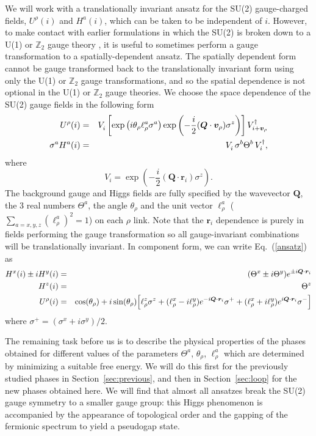 \documentclass[aps,prb,preprint,onecolumn,citeautoscript,superscriptaddress,footinbib,
eqsecnum]{revtex4-1}
\newcommand{\beq}{\begin{equation}}
\newcommand{\eeq}{\end{equation}}
\def\bea{\begin{eqnarray}}
\def\eea{\end{eqnarray}}
\newcommand{\nn}{\nonumber \\}
\begin{document}
We will work with a translationally invariant ansatz \cite{Wen2002} 
for the SU(2) gauge-charged fields, $U^\rho (i)$ and $H^a (i)$, which can be taken to be independent of $i$. However, to make contact with 
earlier formulations in which the SU(2) is broken down to a U(1) or $\mathbb{Z}_2$ gauge theory \cite{SS09,DCSS15b,DCSS16}, 
it is useful to sometimes perform a gauge transformation to a spatially-dependent ansatz. 
The spatially dependent form cannot be gauge transformed back to the translationally invariant form using only the U(1) or $\mathbb{Z}_2$ gauge transformations, and so the spatial dependence is not optional
in the U(1) or $\mathbb{Z}_2$ gauge theories. 
We choose the space dependence of the SU(2) gauge fields
in the following form
\bea
U^\rho (i) &=&  V_{i}^{\vphantom \dagger} \left[ \exp \left( i \theta_\rho \ell_\rho^{ a} \sigma^a \right) \exp \left(  -\frac{i}{2} ({\bm Q} \cdot {\bm v}_{\rho}) \sigma^z \right) \right]
V_{i + {\bm v}_\rho}^\dagger  \nn
\sigma^a H^a (i) &=& V_{i}^{\vphantom \dagger} \, \sigma^b \Theta^b \,  V_{i}^{\dagger},
 \label{ansatz}
\eea
where
\beq
V_i =  \exp \left( - \frac{i}{2} ({\bm Q} \cdot {\bm r}_i) \sigma^z \right).
\eeq
The background gauge and Higgs fields are fully 
specified by the wavevector ${\bm Q}$, the 3 real numbers $\Theta^a$, the angle $\theta_\rho$ and the unit vector $\ell^a_\rho$
($\sum_{a = x,y,z} (\ell^{a}_\rho)^2 = 1$) on each $\rho$ link. Note that the ${\bm r}_i$ dependence is purely in fields performing the gauge transformation
so all gauge-invariant combinations will be translationally invariant. 
In component form, we can write Eq.~(\ref{ansatz}) as
\bea
H^x (i) \pm i H^y (i) &=& (\Theta^x \pm i \Theta^y) e^{\pm i {\bm Q} \cdot {\bm r}_i} \nn\
H^z (i) &=& \Theta^z \nn
U^\rho (i) &=& \cos(\theta_\rho) + i \sin (\theta_\rho) \Bigl[ 
\ell_\rho^z \sigma^z + (\ell_\rho^x - i \ell_\rho^y) e^{-i {\bm Q} \cdot {\bm r}_i} \sigma^+ + (\ell_\rho^x + i \ell_\rho^y) e^{i {\bm Q} \cdot {\bm r}_i} \sigma^- \Bigr] \label{ansatz2}
\eea
where $\sigma^+ = (\sigma^x + i \sigma^y)/2$.

The remaining task before us is to describe the physical properties of the phases obtained for different values of the parameters
$\Theta^a$, $\theta_\rho$, $\ell^a_\rho$ which are determined by
minimizing a suitable free energy. We will do this first for the previously studied phases  in Section~\ref{sec:previous}, and then in Section~\ref{sec:loop} for the new phases obtained here. We will find that almost all ansatzes break the SU(2)
gauge symmetry to a smaller gauge group: this Higgs phenomenon is accompanied by the appearance
of topological order and the gapping of the fermionic spectrum to yield a pseudogap state.
\end{document}
